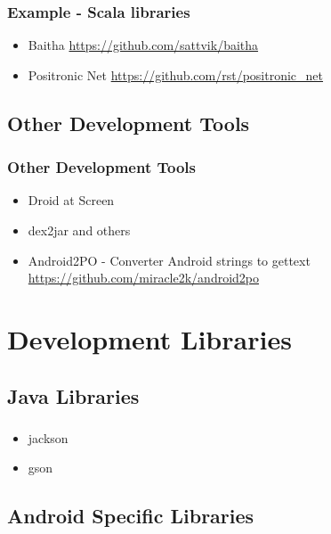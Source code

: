 \documentclass{beamer}
\begin{document}
    \begin{frame}
     \frametitle{Example - Scala libraries}
      \begin{itemize}
       \item Baitha \url{https://github.com/sattvik/baitha}
       \item Positronic Net \url{https://github.com/rst/positronic_net}
      \end{itemize}

    \end{frame}



  \subsection{Other Development Tools}

    \begin{frame}
      \frametitle{Other Development Tools}
      \begin{itemize}
        \item<1->Droid at Screen 
        \item<2->dex2jar and others
        \item<3->Android2PO - Converter Android strings to gettext \url{https://github.com/miracle2k/android2po}
      \end{itemize}
    \end{frame}

\section{Development Libraries}


  \subsection{Java Libraries}

    \begin{frame}
      \frametitle{}
      \begin{itemize}
        \item<1->jackson
        \item<2->gson
      \end{itemize}
    \end{frame}

  \subsection{Android Specific Libraries}
\end{document}
